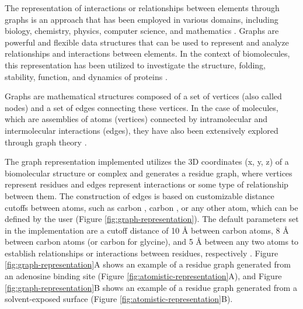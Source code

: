 \documentclass[Ingles]{phdthesis}
\begin{document}

The representation of interactions or relationships between elements through graphs is an approach that has been employed in various domains, including biology, chemistry, physics, computer science, and mathematics \cite{foulds1995,majeed2020}. Graphs are powerful and flexible data structures that can be used to represent and analyze relationships and interactions between elements. In the context of biomolecules, this representation has been utilized to investigate the structure, folding, stability, function, and dynamics of proteins \cite{vishveshwara2002}.

Graphs are mathematical structures composed of a set of vertices (also called nodes) and a set of edges connecting these vertices. In the case of molecules, which are assemblies of atoms (vertices) connected by intramolecular and intermolecular interactions (edges), they have also been extensively explored through graph theory \cite{vishveshwara2002,mason2007}.

The graph representation implemented utilizes the 3D coordinates (x, y, z) of a biomolecular structure or complex and generates a residue graph, where vertices represent residues and edges represent interactions or some type of relationship between them. The construction of edges is based on customizable distance cutoffs between atoms, such as carbon \textalpha, carbon \textbeta, or any other atom, which can be defined by the user (Figure \ref{fig:graph-representation}). The default parameters set in the implementation are a cutoff distance of 10 Å between carbon \textalpha\space atoms, 8 Å between carbon \textbeta\space atoms (or carbon \textalpha\space for glycine), and 5 Å between any two atoms to establish relationships or interactions between residues, respectively \cite{vishveshwara2002,mason2007}. Figure \ref{fig:graph-representation}A shows an example of a residue graph generated from an adenosine binding site (Figure \ref{fig:atomistic-representation}A), and Figure \ref{fig:graph-representation}B shows an example of a residue graph generated from a solvent-exposed surface (Figure \ref{fig:atomistic-representation}B).
\end{document}
